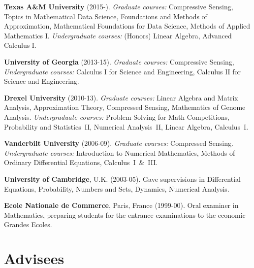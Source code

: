 \documentclass[11pt]{article}
\begin{document}
\bitemize
\item {\bf Texas A\&M University} (2015-).
{\sl Graduate courses:} 
Compressive Sensing,
Topics in Mathematical Data Science,
Foundations and Methods of Approximation,
Mathematical Foundations for Data Science,
Methods of Applied Mathematics I.
{\sl Undergraduate courses:} (Honors) Linear Algebra, Advanced Calculus I.
\item {\bf University of Georgia} (2013-15).
{\sl Graduate courses:}
Compressive Sensing,
{\sl Undergraduate courses:}
Calculus I for Science and Engineering,
Calculus II for Science and Engineering.
\item {\bf Drexel University} (2010-13).
{\sl Graduate courses:}
Linear Algebra and Matrix Analysis, 
Approximation Theory,
Compressed Sensing,
Mathematics of Genome Analysis.
{\sl Undergraduate courses: }
Problem Solving for Math Competitions,
Probability and Statistics~II,
Numerical Analysis~II,
Linear Algebra,
Calculus~I. 
\item {\bf Vanderbilt University} (2006-09). 
{\sl Graduate courses:}
Compressed Sensing. 
{\sl Undergraduate courses:}
Introduction to Numerical Mathematics,
Methods of Ordinary Differential Equations,
 Calculus~I~\&~III.
\item {\bf University of Cambridge}, U.K. (2003-05). Gave supervisions in Differential
 Equations, Probability, Numbers and Sets, Dynamics, Numerical
 Analysis.
 \item {\bf Ecole Nationale de Commerce}, Paris, France (1999-00). Oral
 examiner in Mathematics, preparing students for the
 entrance examinations to the economic Grandes Ecoles.
 \eitemize
 
  
\section{Advisees}
\end{document}
